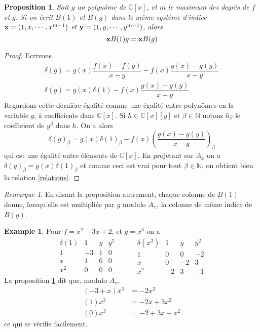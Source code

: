 \documentclass{article}
\theoremstyle{plain}%
\newtheorem{prop}{Proposition}
\theoremstyle{definition}
\newtheorem{exmp}{Example}
\theoremstyle{remark}
\newtheorem*{rem}{Remarque}
\newcommand{\N}{\mathbb{N}}
\newcommand{\C}{\mathbb{C}}
\begin{document}
\begin{prop}
\label{relations_prop}
Soit $g$ un polynôme de $\C[x]$, et $m$ le maximum des degrés de $f$ et $g$. Si on écrit $B(1)$ et $B(g)$ dans le même système d'indice $\bold{x} = (1, x,\cdots, x^{m-1})$ et $\bold{y} = (1, y,\cdots, y^{m-1})$, alors
\begin{equation}
\label{relations}
	\bold{x}B(1)g = \bold{x}B(g)
\end{equation}
\end{prop}
\begin{proof}
Ecrivons
\begin{align} \nonumber
	\delta(g) = g(x)\dfrac{f(x)-f(y)}{x-y} - f(x)\dfrac{g(x)-g(y)}{x-y} \\ \nonumber
	\delta(g) = g(x)\delta(1) - f(x)\dfrac{g(x)-g(y)}{x-y}
\end{align}
Regardons cette dernière égalité comme une égalité entre polynômes en la variable $y$, à coefficients dans $\C[x]$. Si $h\in \C[x][y]$ et $\beta\in\N$ notons $h_\beta$ le coefficient de $y^\beta$ dans $h$. On a alors
$$\delta(g)_\beta = g(x)\delta(1)_\beta - f(x)(\dfrac{g(x)-g(y)}{x-y})_\beta $$
qui est une égalité entre éléments de $\C[x]$. En projetant sur $A_x$ on a
$\delta(g)_\beta = g(x)\delta(1)_\beta$
et comme ceci est vrai pour tout $\beta\in\N$, on obtient bien la relation \ref{relations}.
\end{proof}
\begin{rem}
En disant la  proposition autrement, chaque colonne de $B(1)$ donne, lorsqu'elle est multipliée par $g$ modulo $A_x$, la colonne de même indice de $B(g)$.
\end{rem}
\begin{exmp}
Pour $f = x^2 - 3x + 2$, et $g = x^3$ on a
$$
\begin{array}{c|ccc}
\delta(1) & 1 & y & y^2\\
\hline
1 & -3 & 1 & 0\\
x & 1 & 0 & 0\\
x^2 & 0 & 0 & 0
\end{array}
\hspace{1cm}
\begin{array}{c|ccc}
\delta(x^3) & 1 & y & y^2\\
\hline
1 & 0 & 0 & -2\\
x & 0 & -2 & 3\\
x^2 & -2 & 3 & -1
\end{array}
$$
La proposition \ref{relations_prop} dit que, modulo $A_x$,
\begin{align} \nonumber
	(-3 + x)x^3 &= -2x^2 \\ \nonumber
	(1)x^3 &= -2x + 3x^2 \\ \nonumber
	(0)x^3 &= -2 + 3x - x^2
\end{align}
ce qui se vérifie facilement.
\end{exmp}
\end{document}
